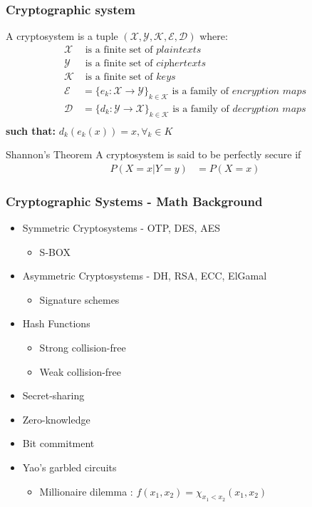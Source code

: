 \begin{frame}
\frametitle{Cryptographic system}

A cryptosystem is a tuple $\mathcal{(X,Y,K,E,D)}$ where:
\begin{align*}
\mathcal{X} &\text{ is a finite set of} \textit{ plaintexts}\\
\mathcal{Y}&\text{ is a finite set of} \textit{ ciphertexts}\\
\mathcal{K}&\text{ is a finite set of} \textit{ keys}\\
\mathcal{E}&=\{e_k:\mathcal{X}\to \mathcal{Y} \}_{k \in \mathcal{K} } \text{ is a family of} \textit{ encryption maps}\\
\mathcal{D}&=\{d_k:\mathcal{Y}\to \mathcal{X} \}_{k \in \mathcal{K} } \text{ is a family of} \textit{ decryption maps}\\
\end{align*}
{\bf such that:}
$ d_k(e_k(x))=x, \forall_k \in K$
\begin{block}
{Shannon's Theorem }
A cryptosystem is said to be perfectly secure if
\begin{align*}
P(X=x|Y=y)&=P(X=x)
\end{align*}
\end{block}
\end{frame}

\begin{frame}
\frametitle{Cryptographic Systems - Math Background }
\begin{itemize}
\item Symmetric Cryptosystems - OTP, DES, AES  
\begin{itemize}
\item S-BOX
\end{itemize}
\item Asymmetric Cryptosystems - DH, RSA, ECC, ElGamal
\begin{itemize}
\item Signature schemes
\end{itemize}
\item Hash Functions
\begin{itemize}
\item Strong collision-free
\item Weak collision-free
\end{itemize}
\item Secret-sharing
\item Zero-knowledge
\item Bit commitment
\item Yao's garbled circuits
\begin{itemize}
\item Millionaire dilemma : $f(x_1 , x_2 ) =  \chi_{x_1 < x_2} (x_1 , x_2 )$  
\end{itemize}

\end{itemize}
\note{}
\end{frame}

